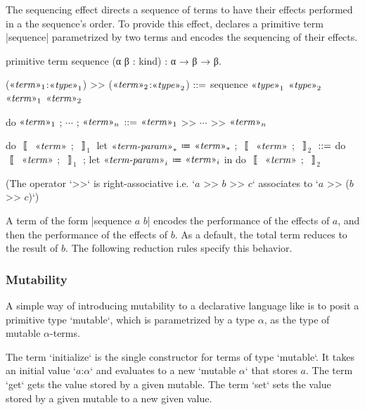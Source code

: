 The sequencing effect directs a sequence of terms to have their effects performed in a the sequence's order.
To provide this effect, \LangB declares a primitive term \code|sequence| parametrized by two terms and encodes the sequencing of their effects.
%
\begin{program}[caption={Primitive for sequencing}]
primitive term sequence (α β : kind) : α → β → β.
\end{program}
%
\begin{notational}[caption={Notations for sequencing}]
($\mvar{term}_1$:$\mvar{type}_1$) >> ($\mvar{term}_2$:$\mvar{type}_2$)
  $\syneq$
    sequence $\mvar{type}_1$ $\mvar{type}_2$ $\mvar{term}_1$ $\mvar{term}_2$

do{ $\mvar{term}_1$ ; $\cdots$ ; $\mvar{term}_n$ }
  $\syneq$
    $\mvar{term}_1$ >> $\cdots$ >> $\mvar{term}_n$

do{ $〚$ $\mvar{term}$ ; $〛_1$ let $\mvar{term-param}_*$ ≔ $\mvar{term}_*$ ; $〚$ $\mvar{term}$ ; $〛_2$ }
  $\syneq$
    do{ $〚$ $\mvar{term}$ ; $〛_1$ ; let $\mvar{term-param}_i$ ≔ $\mvar{term}_i$ in do{ $〚$ $\mvar{term}$ ; $〛_2$ } }
\end{notational}
%
(The operator \code`>>` is right-associative i.e.
\code`$a$ >> $b$ >> $c$` associates to \code`$a$ >> ($b$ >> $c$)`)

A term of the form \code|sequence $a$ $b$| encodes the performance of the effects of $a$, and then the performance of the effects of $b$.
As a default, the total term reduces to the result of $b$.
The following reduction rules specify this behavior.
%


\subsubsection{Mutability}
\label{sec:LangB-mutability}

A simple way of introducing mutability to a declarative language like \LangA is to posit a primitive type \code`mutable`, which is parametrized by a type $α$, as the type of mutable $α$-terms.

The term \code`initialize` is the single constructor for terms of type \code`mutable`.
It takes an initial value \code`$a$:$α$` and evaluates to a new \code`mutable $α$` that stores $a$.
The term \code`get` gets the value stored by a given mutable.
The term \code`set` sets the value stored by a given mutable to a new given value.

